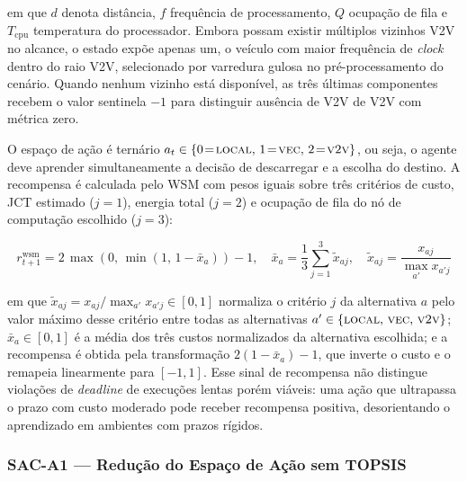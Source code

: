 \noindent em que $d$ denota distância, $f$ frequência de processamento, $Q$ ocupação de fila e $T_{\text{cpu}}$ temperatura do processador. Embora possam existir múltiplos vizinhos \gls{V2V} no alcance, o estado expõe apenas um, o veículo com maior frequência de \textit{clock} dentro do raio \gls{V2V}, selecionado por varredura gulosa no pré-processamento do cenário. Quando nenhum vizinho está disponível, as três últimas componentes recebem o valor sentinela $-1$ para distinguir ausência de \gls{V2V} de \gls{V2V} com métrica zero.

O espaço de ação é ternário $a_t \in \{0\!=\!\textsc{local},\, 1\!=\!\textsc{vec},\, 2\!=\!\textsc{v2v}\}$, ou seja, o agente deve aprender simultaneamente a decisão de descarregar e a escolha do destino. A recompensa é calculada pelo \gls{WSM} com pesos iguais sobre três critérios de custo, \gls{JCT} estimado ($j=1$), energia total ($j=2$) e ocupação de fila do nó de computação escolhido ($j=3$):

\begin{equation}
    r^{\text{wsm}}_{t+1} = 2\,\max\!\left(0,\, \min\!\left(1,\, 1 - \bar{x}_a\right)\right) - 1, \quad
    \bar{x}_a = \frac{1}{3}\sum_{j=1}^{3}\tilde{x}_{aj}, \quad
    \tilde{x}_{aj} = \frac{x_{aj}}{\max_{a'} x_{a'j}}
    \label{eq:reward-wsm}
\end{equation}

\noindent em que $\tilde{x}_{aj} = x_{aj}/\max_{a'} x_{a'j} \in [0,1]$ normaliza o critério $j$ da alternativa $a$ pelo valor máximo desse critério entre todas as alternativas $a' \in \{\textsc{local},\,\textsc{vec},\,\textsc{v2v}\}$; $\bar{x}_a \in [0,1]$ é a média dos três custos normalizados da alternativa escolhida; e a recompensa é obtida pela transformação $2(1-\bar{x}_a)-1$, que inverte o custo e o remapeia linearmente para $[-1,1]$. Esse sinal de recompensa não distingue violações de \textit{deadline} de execuções lentas porém viáveis: uma ação que ultrapassa o prazo com custo moderado pode receber recompensa positiva, desorientando o aprendizado em ambientes com prazos rígidos.

 


\subsubsection*{SAC-A1 — Redução do Espaço de Ação sem TOPSIS}

